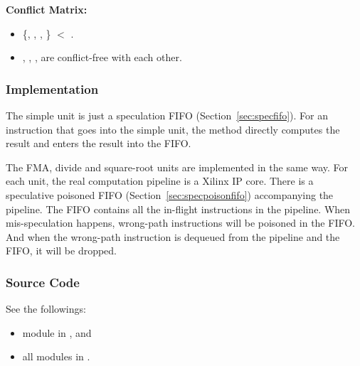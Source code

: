 \noindent\textbf{Conflict Matrix:}
\begin{itemize}
    \item \{, , , \} $<$ .
    \item {}, , ,  are conflict-free with each other.
\end{itemize}


\subsubsection{Implementation}
The simple unit is just a speculation FIFO (Section~\ref{sec:specfifo}).
For an instruction that goes into the simple unit, the  method directly computes the result and enters the result into the FIFO.

The FMA, divide and square-root units are implemented in the same way.
For each unit, the real computation pipeline is a Xilinx IP core.
There is a speculative poisoned FIFO (Section~\ref{sec:specpoisonfifo}) accompanying the pipeline.
The FIFO contains all the in-flight instructions in the pipeline.
When mis-speculation happens, wrong-path instructions will be poisoned in the FIFO.
And when the wrong-path instruction is dequeued from the pipeline and the FIFO, it will be dropped.

\subsubsection{Source Code}
See the followings:
\begin{itemize}
    \item module  in , and
    \item all modules in .
\end{itemize}
